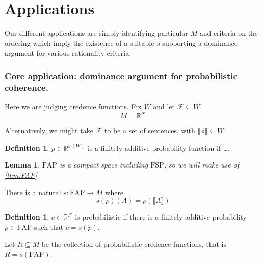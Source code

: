 \documentclass[11pt]{article}
\newtheorem{lemma}[theorem]{Lemma}
\theoremstyle{definition}
\newtheorem{definition}[theorem]{Definition}
\theoremstyle{remark}
\newcommand{\R}{\mathbb R}
\newcommand{\agenda}{\mathcal F}
\newcommand{\FSP}{\mathrm{FSP}}
\newcommand{\FAP}{\mathrm{FAP}}
\begin{document}
\begin{center}
\end{center}


\part{Applications}
Our different applications are simply identifying particular $M$ and criteria on the ordering which imply the existence of a suitable $s$ supporting a dominance argument for various rationality criteria. 

\section{Core application: dominance argument for probabilistic coherence.}





Here we are judging credence functions. 
Fix $W$ and let $\agenda\subseteq W$. 
$$M=\R^\agenda$$

Alternatively, we might take $\agenda$ to be a set of sentences, with $\llbracket \phi\rrbracket \subseteq W$.

\begin{definition}
	$p\in \R^{\wp(W)}$ is a finitely additive probability function if \ldots.
\end{definition}
\begin{lemma}
	$\FAP$ is a compact space including $\FSP$, so we will make use of \cref{thm:FAP}
\end{lemma}

There is a natural $s:\FAP\to M$ where $$s(p)(A)=p(\llbracket A\rrbracket)$$

\begin{definition}
	$c\in \R^\agenda$ is probabilistic if there is a finitely additive probability $p\in \FAP$ such that $c=s(p)$. 
	
	Let $R\subseteq M$ be the collection of probabilistic credence functions, that is $R=s(\FAP)$. 
\end{definition}
\end{document}
